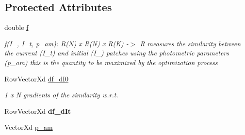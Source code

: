 \subsection*{Protected Attributes}
\begin{DoxyCompactItemize}
\item 
\hypertarget{classAppearanceModel_a6d53ec09e5561b33648d07dcbe437292}{double \hyperlink{classAppearanceModel_a6d53ec09e5561b33648d07dcbe437292}{f}}\label{classAppearanceModel_a6d53ec09e5561b33648d07dcbe437292}

\begin{DoxyCompactList}\small\item\em f(\-I\-\_, I\-\_\-t, p\-\_\-am)\-: R(\-N) x R(\-N) x R(\-K) -\/$>$ R measures the similarity between the current (I\-\_\-t) and initial (I\-\_) patches using the photometric parameters (p\-\_\-am) this is the quantity to be maximized by the optimization process \end{DoxyCompactList}\item 
Row\-Vector\-Xd \hyperlink{classAppearanceModel_a6434cfd26c953bd685e25ebf10ccc6ec}{df\-\_\-d\-I0}
\begin{DoxyCompactList}\small\item\em 1 x N gradients of the similarity w.\-r.\-t. \end{DoxyCompactList}\item 
\hypertarget{classAppearanceModel_ac7866799041ac417ec38a7d3a025da38}{Row\-Vector\-Xd {\bfseries df\-\_\-d\-It}}\label{classAppearanceModel_ac7866799041ac417ec38a7d3a025da38}

\item 
\hypertarget{classAppearanceModel_a59578db2322a67079f0c91335050cd23}{Vector\-Xd \hyperlink{classAppearanceModel_a59578db2322a67079f0c91335050cd23}{p\-\_\-am}}\label{classAppearanceModel_a59578db2322a67079f0c91335050cd23}


\end{DoxyCompactItemize}
